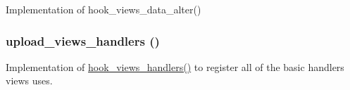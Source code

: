 Implementation of hook\_\-views\_\-data\_\-alter() \hypertarget{group__views__upload__module_gc45654d1a172945c169b1bdbf317b3ee}{
\subsubsection[{upload\_\-views\_\-handlers}]{\setlength{\rightskip}{0pt plus 5cm}upload\_\-views\_\-handlers ()}}
\label{group__views__upload__module_gc45654d1a172945c169b1bdbf317b3ee}


Implementation of \hyperlink{group__views__hooks_gbf506f44bd8d8a86876f27396f5341ed}{hook\_\-views\_\-handlers()} to register all of the basic handlers views uses. 